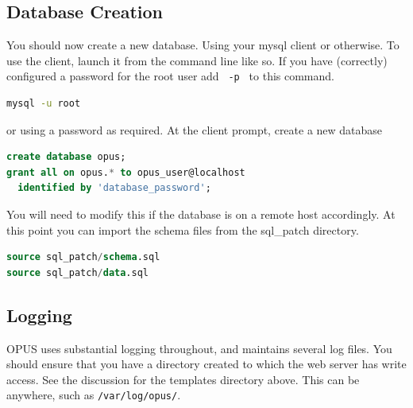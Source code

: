 \documentclass[12 pt]{book}
\begin{document}

\subsection{Database Creation}

You should now create a new database. Using your mysql client or otherwise. To use the client, launch it from the
command line like so. If you have (correctly) configured a password for the root user add \lstinline! -p ! to this command.
\begin{lstlisting}[language=bash]
mysql -u root
\end{lstlisting}
or using a password as required. At the client prompt, create a new database
\begin{lstlisting}[language=SQL]
create database opus;
grant all on opus.* to opus_user@localhost
  identified by 'database_password';
\end{lstlisting}

You will need to modify this if the database is on a remote host accordingly. At this point
you can import the schema files from the sql\_patch directory.
\begin{lstlisting}[language=SQL]
source sql_patch/schema.sql
source sql_patch/data.sql
\end{lstlisting}

\subsection{Logging}

OPUS uses substantial logging throughout, and maintains several log files. You should ensure that you have a directory created to which
the web server has write access. See the discussion for the templates directory above. This can be anywhere, such as \lstinline!/var/log/opus/!.

%
%
%
%
%
%
\end{document}
